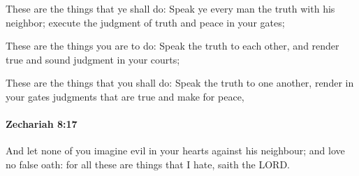 			\begin{versebox}
					\item[BHS] 
					\item[LXX] 
					\item[ASV] These are the things that ye shall do: Speak ye every man the truth with his neighbor; execute the judgment of truth and peace in your gates;
					\item[NIV] These are the things you are to do: Speak the truth to each other, and render true and sound judgment in your courts;
					\item[NRSV] These are the things that you shall do: Speak the truth to one another, render in your gates judgments that are true and make for peace,
			\end{versebox}

		\paragraph{Zechariah 8:17} %
			\label{ZECHARIAH-8-17}

			And let none of you imagine evil in your hearts against his neighbour; and love no false oath: for all these are things that I hate, saith the LORD.

